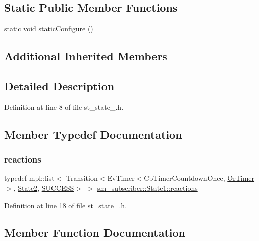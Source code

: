 \subsection*{Static Public Member Functions}
\begin{DoxyCompactItemize}
\item 
static void \hyperlink{structsm__subscriber_1_1State1_ae878310b93e6fb33efaf0a2d53533dc0}{static\+Configure} ()
\end{DoxyCompactItemize}
\subsection*{Additional Inherited Members}


\subsection{Detailed Description}


Definition at line 8 of file st\+\_\+state\+\_.\+h.



\subsection{Member Typedef Documentation}
\mbox{\label{structsm__subscriber_1_1State1_afb6efba4aeabaa5423876c725b4c2e70}} 
\subsubsection{\texorpdfstring{reactions}{reactions}}
{\footnotesize\ttfamily typedef mpl\+::list$<$ Transition$<$Ev\+Timer$<$Cb\+Timer\+Countdown\+Once, \hyperlink{classsm__subscriber_1_1OrTimer}{Or\+Timer}$>$, \hyperlink{structsm__subscriber_1_1State2}{State2}, \hyperlink{structsmacc_1_1default__transition__tags_1_1SUCCESS}{S\+U\+C\+C\+E\+SS}$>$ $>$ \hyperlink{structsm__subscriber_1_1State1_afb6efba4aeabaa5423876c725b4c2e70}{sm\+\_\+subscriber\+::\+State1\+::reactions}}



Definition at line 18 of file st\+\_\+state\+\_.\+h.



\subsection{Member Function Documentation}
\mbox{\label{structsm__subscriber_1_1State1_a20fcc20aab6ea52a463e3b275585bafb}} 
